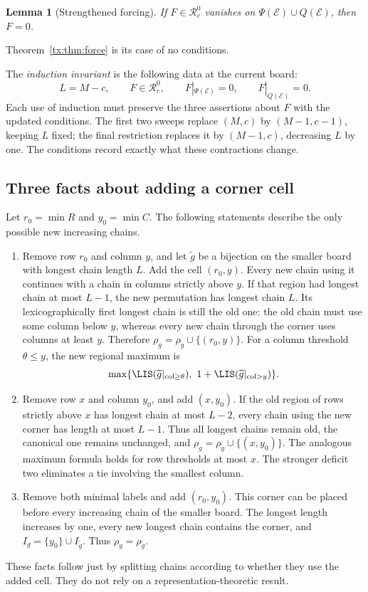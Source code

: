 \documentclass[11pt,a4paper,oneside,openany]{book}
\newtheorem{lemma}[theorem]{Lemma}
\theoremstyle{definition}\newtheorem{definition}[theorem]{Definition}
\theoremstyle{remark}\newtheorem{remark}[theorem]{Remark}
\numberwithin{equation}{chapter}
\begin{document}
\begin{lemma}[Strengthened forcing]\label{tx:lem:GP}
If $F\in \mathcal R_c^{0}$ vanishes on $\Psi(\mathcal E)\cup Q(\mathcal E)$, then $F=0$.
\end{lemma}
Theorem~\ref{tx:thm:force} is its case of no conditions.

The \emph{induction invariant} is the following data at the current board:
\[
 L=M-c,\qquad F\in\mathcal R_c^0,\qquad
 F|_{\Psi(\mathcal E)}=0,\qquad F|_{Q(\mathcal E)}=0.
\]
Each use of induction must preserve the three assertions about $F$ with the updated conditions. The first two sweeps replace $(M,c)$ by $(M-1,c-1)$, keeping $L$ fixed; the final restriction replaces it by $(M-1,c)$, decreasing $L$ by one. The conditions record exactly what these contractions change.

\subsection{Three facts about adding a corner cell}
Let $r_0=\min R$ and $y_0=\min C$. The following statements describe the only possible new increasing chains.
\begin{enumerate}
\item Remove row $r_0$ and column $y$, and let $\widetilde g$ be a bijection on the smaller board with longest chain length $L$. Add the cell $(r_0,y)$. Every new chain using it continues with a chain in columns strictly above $y$. If that region had longest chain at most $L-1$, the new permutation has longest chain $L$. Its lexicographically first longest chain is still the old one: the old chain must use some column below $y$, whereas every new chain through the corner uses columns at least $y$. Therefore $\rho_g=\rho_{\widetilde g}\cup\{(r_0,y)\}$. For a column threshold $\theta\le y$, the new regional maximum is
\[\max\{\LIS(\widetilde g|_{\mathrm{col}\ge\theta}),\ 1+\LIS(\widetilde g|_{\mathrm{col}>y})\}.
\]
\item Remove row $x$ and column $y_0$, and add $(x,y_0)$. If the old region of rows strictly above $x$ has longest chain at most $L-2$, every chain using the new corner has length at most $L-1$. Thus all longest chains remain old, the canonical one remains unchanged, and $\rho_g=\rho_{\widetilde g}\cup\{(x,y_0)\}$. The analogous maximum formula holds for row thresholds at most $x$. The stronger deficit two eliminates a tie involving the smallest column.
\item Remove both minimal labels and add $(r_0,y_0)$. This corner can be placed before every increasing chain of the smaller board. The longest length increases by one, every new longest chain contains the corner, and $I_g=\{y_0\}\cup I_{\widetilde g}$. Thus $\rho_g=\rho_{\widetilde g}$.
\end{enumerate}
These facts follow just by splitting chains according to whether they use the added cell. They do not rely on a representation-theoretic result.
\end{document}
